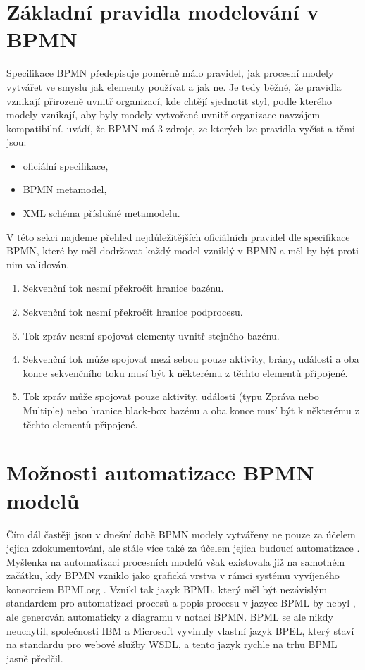 \section{Základní pravidla modelování v BPMN}
Specifikace BPMN předepisuje poměrně málo pravidel, jak procesní modely vytvářet ve smyslu jak elementy používat a jak ne. Je tedy běžné, že pravidla vznikají přirozeně uvnitř organizací, kde chtějí sjednotit styl, podle kterého modely vznikají, aby byly modely vytvořené uvnitř organizace navzájem kompatibilní. \cite{Silver2011} uvádí, že BPMN má 3 zdroje, ze kterých lze pravidla vyčíst a těmi jsou:

\begin{itemize}
\item oficiální specifikace,
\item BPMN metamodel,
\item XML schéma příslušné metamodelu.
\end{itemize}

V této sekci najdeme přehled nejdůležitějších oficiálních pravidel dle specifikace BPMN, které by měl dodržovat každý model vzniklý v BPMN a měl by být proti nim validován.

\begin{enumerate}
\item Sekvenční tok nesmí překročit hranice bazénu.
\item Sekvenční tok nesmí překročit hranice podprocesu.
\item Tok zpráv nesmí spojovat elementy uvnitř stejného bazénu.
\item Sekvenční tok může spojovat mezi sebou pouze aktivity, brány, události a oba konce sekvenčního toku musí být k některému z těchto elementů připojené.
\item Tok zpráv může spojovat pouze aktivity, události (typu Zpráva nebo Multiple) nebo hranice black-box bazénu a oba konce musí být k některému z těchto elementů připojené.
\end{enumerate}

\section{Možnosti automatizace BPMN modelů}
Čím dál častěji jsou v dnešní době BPMN modely vytvářeny ne pouze za účelem jejich zdokumentování, ale stále více také za účelem jejich budoucí automatizace \cite{Leymann2009}. Myšlenka na automatizaci procesních modelů však existovala již na samotném začátku, kdy BPMN vzniklo jako grafická vrstva v rámci systému vyvíjeného konsorciem BPMI.org \cite{Silver2011}. Vznikl tak jazyk BPML, který měl být nezávislým standardem pro automatizaci procesů a popis procesu v jazyce BPML by nebyl , ale generován automaticky z diagramu v notaci BPMN. BPML se ale nikdy neuchytil, společnosti IBM a Microsoft vyvinuly vlastní jazyk BPEL, který staví na standardu pro webové služby WSDL, a tento jazyk rychle na trhu BPML jasně předčil.

